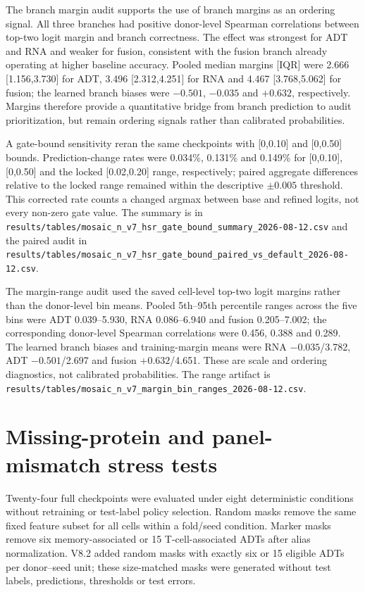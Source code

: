 \documentclass[10pt]{article}
\begin{document}
The branch margin audit supports the use of branch margins as an ordering signal. All three branches had positive donor-level Spearman correlations between top-two logit margin and branch correctness. The effect was strongest for ADT and RNA and weaker for fusion, consistent with the fusion branch already operating at higher baseline accuracy. Pooled median margins [IQR] were 2.666 [1.156,3.730] for ADT, 3.496 [2.312,4.251] for RNA and 4.467 [3.768,5.062] for fusion; the learned branch biases were $-0.501$, $-0.035$ and $+0.632$, respectively. Margins therefore provide a quantitative bridge from branch prediction to audit prioritization, but remain ordering signals rather than calibrated probabilities.

A gate-bound sensitivity reran the same checkpoints with [0,0.10] and [0,0.50] bounds. Prediction-change rates were 0.034\%, 0.131\% and 0.149\% for [0,0.10], [0,0.50] and the locked [0.02,0.20] range, respectively; paired aggregate differences relative to the locked range remained within the descriptive $\pm0.005$ threshold. This corrected rate counts a changed argmax between base and refined logits, not every non-zero gate value. The summary is in \texttt{results/tables/mosaic\_n\_v7\_hsr\_gate\_bound\_summary\_2026-08-12.csv} and the paired audit in \texttt{results/tables/mosaic\_n\_v7\_hsr\_gate\_bound\_paired\_vs\_default\_2026-08-12.csv}.

The margin-range audit used the saved cell-level top-two logit margins rather than the donor-level bin means. Pooled 5th--95th percentile ranges across the five bins were ADT 0.039--5.930, RNA 0.086--6.940 and fusion 0.205--7.002; the corresponding donor-level Spearman correlations were 0.456, 0.388 and 0.289. The learned branch biases and training-margin means were RNA $-0.035$/3.782, ADT $-0.501$/2.697 and fusion $+0.632$/4.651. These are scale and ordering diagnostics, not calibrated probabilities. The range artifact is \texttt{results/tables/mosaic\_n\_v7\_margin\_bin\_ranges\_2026-08-12.csv}.

\section{Missing-protein and panel-mismatch stress tests}

Twenty-four full checkpoints were evaluated under eight deterministic conditions without retraining or test-label policy selection. Random masks remove the same fixed feature subset for all cells within a fold/seed condition. Marker masks remove six memory-associated or 15 T-cell-associated ADTs after alias normalization. V8.2 added random masks with exactly six or 15 eligible ADTs per donor--seed unit; these size-matched masks were generated without test labels, predictions, thresholds or test errors.
\end{document}
